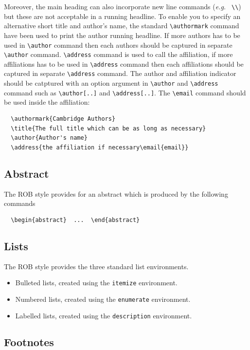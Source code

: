 \documentclass[DTMColor]{ROB-New}
\begin{document}
Moreover, the main heading can also incorporate new line commands
({\it e.g.\ } \verb"\\") but these are not acceptable in a running headline.
To enable you to specify an alternative short title and author's name, the
standard \verb"\authormark" command have been used to print the author running headline. If more authors has to be used in \verb"\author" command then each authors should be captured in separate \verb"\author" command.
\verb"\address" command is used to call the affiliation, if more affiliations has to be used in \verb"\address" command then each affiliations should be captured in separate \verb"\address" command. The author and affiliation indicator should be catptured with an option argument in \verb"\author" and \verb"\address" command such as \verb"\author[..]" and \verb"\address[..]". The \verb"\email" command should be used inside the affiliation:
%
\begin{verbatim}
  \authormark{Cambridge Authors}
  \title{The full title which can be as long as necessary}
  \author{Author's name}
  \address{the affiliation if necessary\email{email}}
\end{verbatim}
%
\subsection{Abstract}

The ROB style provides for an abstract which is produced by the following
commands
%
\begin{verbatim}
  \begin{abstract}  ...  \end{abstract}
\end{verbatim}

\subsection{Lists}

The ROB style provides the three standard list environments.
\begin{itemize}
  \item Bulleted lists, created using the \verb"itemize" environment.
  \item Numbered lists, created using the \verb"enumerate" environment.
  \item Labelled lists, created using the \verb"description" environment.
\end{itemize}

\subsection{Footnotes}
\end{document}
